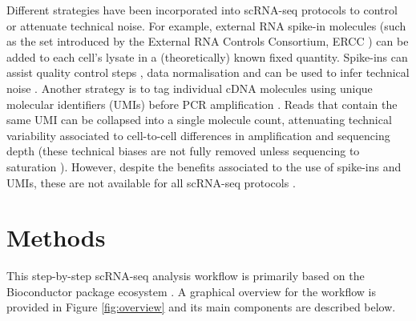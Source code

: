 \documentclass[9pt,a4paper,]{extarticle}
\begin{document}
Different strategies have been incorporated into scRNA-seq protocols to control
or attenuate technical noise.
For example, external RNA spike-in molecules (such as the set introduced by the
External RNA Controls Consortium, ERCC \citep{Rna2005}) can be added to each cell's
lysate in a (theoretically) known fixed quantity.
Spike-ins can assist quality control steps \citep{McCarthy2017}, data normalisation
\citep{Vallejos2017} and can be used to infer technical noise \citep{Brennecke2013}.
Another strategy is to tag individual cDNA molecules using unique molecular
identifiers (UMIs) before PCR amplification \citep{Islam2014}.
Reads that contain the same UMI can be collapsed into a single molecule count,
attenuating technical variability associated to cell-to-cell differences
in amplification and sequencing depth (these technical biases are not fully
removed unless sequencing to saturation \citep{Vallejos2017}).
However, despite the benefits associated to the use of spike-ins and UMIs,
these are not available for all scRNA-seq protocols \citep{Haque2017}.

\hypertarget{methods}{%
\section{Methods}\label{methods}}

This step-by-step scRNA-seq analysis workflow is primarily based on the
Bioconductor package ecosystem \citep{Amezquita2019}.
A graphical overview for the workflow is provided in Figure \ref{fig:overview}
and its main components are described below.
\end{document}
